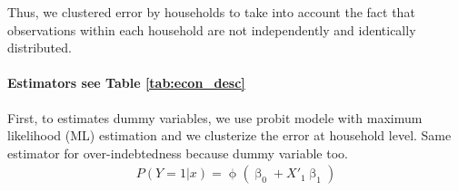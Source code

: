 \documentclass[a4paper, 11pt, onecolumn]{article}
\begin{document}
Thus, we clustered error by households to take into account the fact that observations within each household are not independently and identically distributed.



\paragraph{Estimators see Table \ref{tab:econ_desc}}


First, to estimates dummy variables, we use probit modele with maximum likelihood (ML) estimation and we clusterize the error at household level.
Same estimator for over-indebtedness because dummy variable too. 
\begin{equation}\label{eq:probit}
\begin{split}
P(Y=1|x)=\upphi(\upbeta_{0}+X'_{1}\upbeta_{1})
\end{split}
\end{equation}
\end{document}
